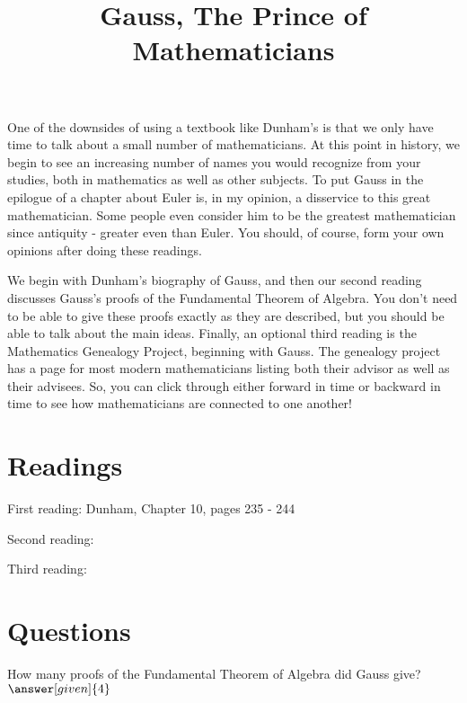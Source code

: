 \documentclass[nooutcomes]{ximera}
\title{Gauss, The Prince of Mathematicians}
\begin{document}
\begin{abstract}
    
\end{abstract}
\maketitle



One of the downsides of using a textbook like Dunham's is that we only have time to talk about a small number of mathematicians.  At this point in history, we begin to see an increasing number of names you would recognize from your studies, both in mathematics as well as other subjects.  To put Gauss in the epilogue of a chapter about Euler is, in my opinion, a disservice to this great mathematician.  Some people even consider him to be the greatest mathematician since antiquity - greater even than Euler.  You should, of course, form your own opinions after doing these readings.

We begin with Dunham's biography of Gauss, and then our second reading discusses Gauss's proofs of the Fundamental Theorem of Algebra.  You don't need to be able to give these proofs exactly as they are described, but you should be able to talk about the main ideas.  Finally, an optional third reading is the Mathematics Genealogy Project, beginning with Gauss.  The genealogy project has a page for most modern mathematicians listing both their advisor as well as their advisees.  So, you can click through either forward in time or backward in time to see how mathematicians are connected to one another!


\section{Readings}
First reading: Dunham, Chapter 10, pages 235 - 244

Second reading: 

Third reading: 



\section{Questions}

\begin{question}
How many proofs of the Fundamental Theorem of Algebra did Gauss give? $\answer[given]{4}$
\end{question}
\end{document}
